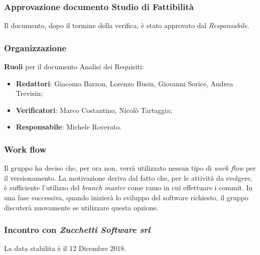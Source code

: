 \subsubsection{Approvazione documento Studio di Fattibilità}
Il documento, dopo il termine della verifica, è stato approvato dal \emph{Responsabile}.

\newpage

\subsubsection{Organizzazione}
\textbf{Ruoli} per il documento Analisi dei Requisiti:
\begin{itemize}
\item{\textbf{Redattori}: Giacomo Barzon, Lorenzo Busin, Giovanni Sorice, Andrea Trevisin;}
\item{\textbf{Verificatori}: Marco Costantino, Nicolò Tartaggia;}
\item{\textbf{Responsabile}: Michele Roverato.}
\end{itemize}

\subsubsection{Work flow}
Il gruppo ha deciso che, per ora non, verrà utilizzato nessun tipo di \emph{work flow} per il versionamento. La motivazione deriva dal fatto che, per le attività da svolgere, è sufficiente l'utilizzo del \emph{branch master} come ramo in cui effettuare i commit. In una fase successiva, quando inizierà lo sviluppo del software richiesto, il gruppo discuterà nuovamente se utilizzare questa opzione.

\subsubsection{Incontro con \emph{Zucchetti Software srl}}
La data stabilita è il 12 Dicembre 2018.